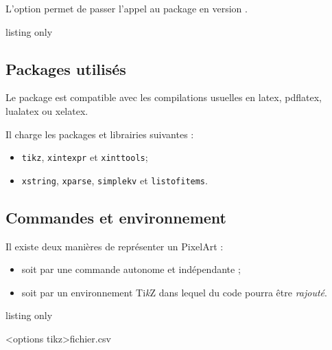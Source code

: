 \documentclass{article}
\newcommand\Cle[1]{{\bfseries\sffamily\textlangle #1\textrangle}}
\begin{document}
\smallskip

L'option \Cle{[csvii]} permet de passer l'appel au package en version .

\begin{PresentationCode}{listing only}
\usepackage{PixelArtTikz}                     %

\usepackage[csvii]{PixelArtTikz}              %
\end{PresentationCode}

\subsection{Packages utilisés}

Le package est compatible avec les compilations usuelles en \textsf{latex}, \textsf{pdflatex}, \textsf{lualatex} ou \textsf{xelatex}.

\medskip

Il charge les packages et librairies suivantes :

\begin{itemize}
	\item \texttt{tikz}, \texttt{xintexpr} et \texttt{xinttools};
	\item \texttt{xstring}, \texttt{xparse}, \texttt{simplekv} et \texttt{listofitems}.
\end{itemize}

\pagebreak

\subsection{Commandes et environnement}

Il existe deux manières de représenter un PixelArt :

\begin{itemize}
	\item soit par une commande autonome et indépendante ;
	\item soit par un environnement Ti\textit{k}Z dans lequel du code pourra être \textit{rajouté}.
\end{itemize}

\begin{PresentationCode}{listing only}


\begin{EnvPixelArtTikz}[clés]<options tikz>{fichier.csv}
\end{EnvPixelArtTikz}
\end{PresentationCode}
\end{document}
